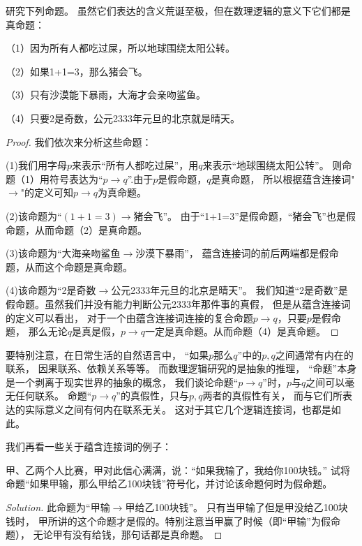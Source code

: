 \begin{example}研究下列命题。
虽然它们表达的含义荒诞至极，但在数理逻辑的意义下它们都是真命题：

（1）因为所有人都吃过屎，所以地球围绕太阳公转。

（2）如果1+1=3，那么猪会飞。

（3）只有沙漠能下暴雨，大海才会亲吻鲨鱼。

（4）只要2是奇数，公元2333年元旦的北京就是晴天。
\end{example}
\begin{proof}
我们依次来分析这些命题：

(1)我们用字母$p$来表示“所有人都吃过屎”，用$q$来表示“地球围绕太阳公转”。
则命题（1）用符号表达为“$p\rightarrow q$”.由于$p$是假命题，$q$是真命题，
所以根据蕴含连接词"$\rightarrow$"的定义可知$p\rightarrow q$为真命题。

(2)该命题为“$(1+1=3)\rightarrow\text{猪会飞}$”。
由于“1+1=3”是假命题，“猪会飞”也是假命题，从而命题（2）是真命题。

(3)该命题为“大海亲吻鲨鱼$\rightarrow$沙漠下暴雨”，
蕴含连接词的前后两端都是假命题，从而这个命题是真命题。

(4)该命题为“2是奇数$\rightarrow$公元2333年元旦的北京是晴天”。
我们知道“2是奇数”是假命题。虽然我们并没有能力判断公元2333年那件事的真假，
但是从蕴含连接词的定义可以看出，
对于一个由蕴含连接词连接的复合命题$p\rightarrow q$，只要$p$是假命题，
那么无论$q$是真是假，$p\rightarrow q$一定是真命题。从而命题（4）是真命题。
\end{proof}

要特别注意，在日常生活的自然语言中，
“如果$p$那么$q$”中的$p,q$之间通常有内在的联系，
因果联系、依赖关系等等。
而数理逻辑研究的是抽象的推理，
“命题”本身是一个剥离于现实世界的抽象的概念，
我们谈论命题“$p\rightarrow q$”时，$p$与$q$之间可以毫无任何联系。
命题“$p\rightarrow q$”的真假性，只与$p,q$两者的真假性有关，
而与它们所表达的实际意义之间有何内在联系无关。
这对于其它几个逻辑连接词，也都是如此。

我们再看一些关于蕴含连接词的例子：

\begin{example}
甲、乙两个人比赛，甲对此信心满满，说：“如果我输了，我给你100块钱。”
试将命题“如果甲输，那么甲给乙100块钱”符号化，并讨论该命题何时为假命题。
\end{example}
\begin{proof}[Solution]
此命题为“甲输$\rightarrow$甲给乙100块钱”。
只有当甲输了但是甲没给乙100块钱时，
甲所讲的这个命题才是假的。特别注意当甲赢了时候（即“甲输”为假命题），
无论甲有没有给钱，那句话都是真命题。
\end{proof}

